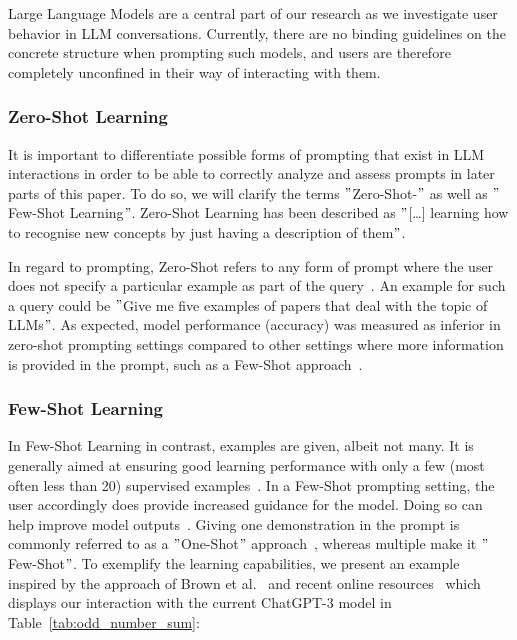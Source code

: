 Large Language Models are a central part of our research as we investigate user behavior in LLM
conversations.
Currently, there are no binding guidelines on the concrete structure when prompting such models,
and users are therefore completely unconfined in their way of interacting with them.


\subsubsection{Zero-Shot Learning} %
It is important to differentiate possible forms of prompting that exist in LLM interactions in order
to be able to correctly analyze and assess prompts in later parts of this paper.
To do so, we will clarify the terms \("\)Zero-Shot-\("\) as well as \("\)Few-Shot Learning\("\).
Zero-Shot Learning has been described as \("\)[\ldots] learning how to recognise
new concepts by just having a description of them\("\)\cite[p. 1]{feris_embarrassingly_2015}.

In regard to prompting, Zero-Shot refers to any form of prompt where the user does not specify
a particular example as part of the query~\cite[p. 1]{dang_how_2022}.
An example for such a query could be \("\)Give me five examples of papers that deal with the topic
of LLMs\("\).
As expected, model performance (accuracy) was measured as inferior in zero-shot prompting settings compared
to other settings where more information is provided in the prompt, such as a Few-Shot approach~\cite[p. 5]{brown_language_2020}.


\subsubsection{Few-Shot Learning}
In Few-Shot Learning in contrast, examples are given, albeit not many.
It is generally aimed at ensuring good learning performance with only a few (most often less than 20)
supervised examples~\cite[p. 1]{samuel_offline_2022}. %
In a Few-Shot prompting setting, the user accordingly does provide increased guidance for the model.
Doing so can help improve model outputs~\cite[p. 1]{dang_how_2022}.
Giving one demonstration in the prompt is commonly referred to as a \("\)One-Shot\("\) approach~\cite[p. 6]{brown_language_2020},
whereas multiple make it \("\)Few-Shot\("\).
To exemplify the learning capabilities, we present an example inspired by the approach of Brown et al\(.\)~\cite{brown_language_2020}
and recent online resources~\cite{dairai_few-shot_2023} which displays our interaction with
the current ChatGPT-3 model in Table~\ref{tab:odd_number_sum}:


